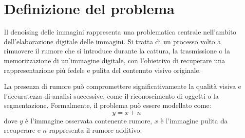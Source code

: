 \documentclass[12pt,a4paper,openright,twoside]{book}
\begin{document}
\section{Definizione del problema}
Il denoising delle immagini rappresenta una problematica centrale nell'ambito dell'elaborazione digitale delle immagini. Si tratta di un processo volto a rimuovere il rumore che si introduce durante la cattura, la trasmissione o la memorizzazione di un'immagine digitale, con l'obiettivo di recuperare una rappresentazione più fedele e pulita del contenuto visivo originale. 

La presenza di rumore può compromettere significativamente la qualità visiva e l'accuratezza di analisi successive, come il riconoscimento di oggetti o la segmentazione. Formalmente, il problema può essere modellato come:
\[
y = x + n
\]
dove $y$ è l'immagine osservata contenente rumore, $x$ è l'immagine pulita da recuperare e $n$ rappresenta il rumore additivo.
\whiteline
\end{document}
